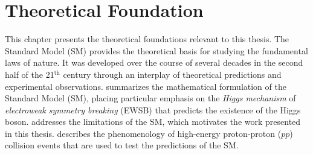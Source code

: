 \chapter{Theoretical Foundation}
\label{chap:theory}
This chapter presents the theoretical foundations relevant to this thesis.  
The Standard Model (SM) provides the theoretical basis for studying the fundamental laws of nature.
It was developed over the course of several decades in the second half of the 21$^{\text{th}}$ century through an interplay of theoretical predictions and experimental observations.
 summarizes the mathematical formulation of the Standard Model (SM), placing particular emphasis on the \emph{Higgs mechanism} of \emph{electroweak symmetry breaking} (EWSB) that predicts the existence of the Higgs boson.
 addresses the limitations of the SM, which motivates the work presented in this thesis. 
 describes the phenomenology of high-energy proton-proton ($pp$) collision events that are used to test the predictions of the SM.



